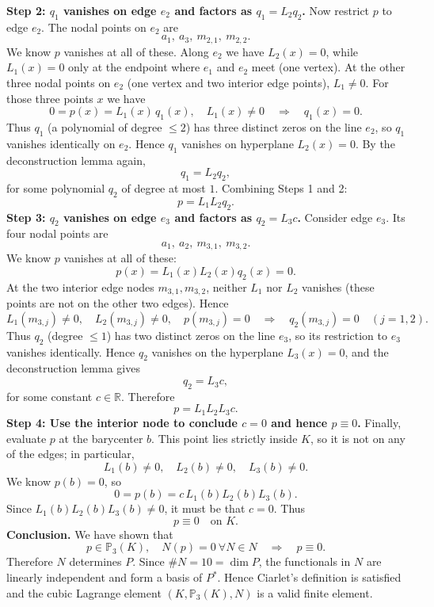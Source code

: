\textbf{Step 2: $q_1$ vanishes on edge $e_2$ and factors as $q_1 = L_2 q_2$.}
Now restrict $p$ to edge $e_2$. The nodal points on $e_2$ are
\[
    a_1,\ a_3,\ m_{2,1},\ m_{2,2}.
\]
We know $p$ vanishes at all of these.
Along $e_2$ we have $L_2(x)=0$, while $L_1(x)=0$ only at the endpoint where $e_1$ and $e_2$
meet (one vertex). At the other three nodal points on $e_2$ (one vertex and two interior
edge points), $L_1\neq 0$.
For those three points $x$ we have
\[
    0 = p(x) = L_1(x)\,q_1(x), \quad L_1(x) \neq 0 \quad\Rightarrow\quad q_1(x)=0.
\]
Thus $q_1$ (a polynomial of degree $\le 2$) has three distinct zeros on the line $e_2$, so
$q_1$ vanishes identically on $e_2$.
Hence $q_1$ vanishes on hyperplane $L_2(x)=0$. By the deconstruction lemma again,
\[
    q_1 = L_2 q_2,
\]
for some polynomial $q_2$ of degree at most $1$.
Combining Steps 1 and 2:
\[
    p = L_1 L_2 q_2.
\]
\textbf{Step 3: $q_2$ vanishes on edge $e_3$ and factors as $q_2 = L_3 c$.}
Consider edge $e_3$. Its four nodal points are
\[
    a_1,\ a_2,\ m_{3,1},\ m_{3,2}.
\]
We know $p$ vanishes at all of these:
\[
    p(x) = L_1(x)L_2(x)q_2(x) = 0.
\]
At the two interior edge nodes $m_{3,1},m_{3,2}$, neither $L_1$ nor $L_2$ vanishes
(these points are not on the other two edges). Hence
\[
    L_1(m_{3,j})\neq 0,\quad L_2(m_{3,j})\neq 0,\quad p(m_{3,j})=0
    \quad \Rightarrow\quad q_2(m_{3,j}) = 0 \quad (j=1,2).
\]
Thus $q_2$ (degree $\le 1$) has two distinct zeros on the line $e_3$, so its restriction
to $e_3$ vanishes identically. Hence $q_2$ vanishes on the hyperplane $L_3(x)=0$, and the
deconstruction lemma gives
\[
    q_2 = L_3 c,
\]
for some constant $c\in\mathbb{R}$.
Therefore
\[
    p = L_1 L_2 L_3 c.
\]
\textbf{Step 4: Use the interior node to conclude $c=0$ and hence $p\equiv 0$.}
Finally, evaluate $p$ at the barycenter $b$. This point lies strictly inside $K$, so it
is not on any of the edges; in particular,
\[
    L_1(b)\neq 0,\quad L_2(b)\neq 0,\quad L_3(b)\neq 0.
\]
We know $p(b)=0$, so
\[
    0 = p(b) = c\,L_1(b)L_2(b)L_3(b).
\]
Since $L_1(b)L_2(b)L_3(b)\neq 0$, it must be that $c=0$. Thus
\[
    p \equiv 0 \quad\text{on }K.
\]
\textbf{Conclusion.}
We have shown that
\[
    p\in\mathbb{P}_3(K),\quad N(p)=0\ \forall N\in N
    \quad \Rightarrow\quad p\equiv 0.
\]
Therefore $N$ determines $P$. Since $\#N = 10 = \dim P$, the functionals in $N$ are
linearly independent and form a basis of $P^\ast$.
Hence Ciarlet's definition is satisfied and the cubic Lagrange element
$(K,\mathbb{P}_3(K),N)$ is a valid finite element.
